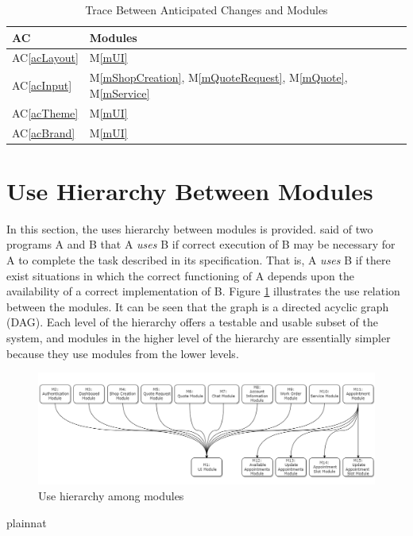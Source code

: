 \documentclass[12pt, titlepage]{article}
\newcommand{\acref}[1]{AC\ref{#1}}
\newcommand{\mref}[1]{M\ref{#1}}
\begin{document}
\begin{table}[H]
\centering
\begin{tabular}{p{} p{}}
\toprule
\textbf{AC} & \textbf{Modules}\\
\midrule
\acref{acLayout} & \mref{mUI}\\
\acref{acInput} & \mref{mShopCreation}, \mref{mQuoteRequest}, \mref{mQuote}, \mref{mService}\\
\acref{acTheme} & \mref{mUI}\\
\acref{acBrand} & \mref{mUI}\\
\bottomrule
\end{tabular}
\caption{Trace Between Anticipated Changes and Modules}
\label{TblACT}
\end{table}

\section{Use Hierarchy Between Modules} \label{SecUse}

In this section, the uses hierarchy between modules is
provided. \citet{Parnas1978} said of two programs A and B that A {\em uses} B if
correct execution of B may be necessary for A to complete the task described in
its specification. That is, A {\em uses} B if there exist situations in which
the correct functioning of A depends upon the availability of a correct
implementation of B.  Figure \ref{FigUH} illustrates the use relation between
the modules. It can be seen that the graph is a directed acyclic graph
(DAG). Each level of the hierarchy offers a testable and usable subset of the
system, and modules in the higher level of the hierarchy are essentially simpler
because they use modules from the lower levels.

\begin{figure}[H]
\centering
\includegraphics[width=1\textwidth]{UsesHierarchy.png}
\caption{Use hierarchy among modules}
\label{FigUH}
\end{figure}


 {plainnat}


\newpage{}
\end{document}
